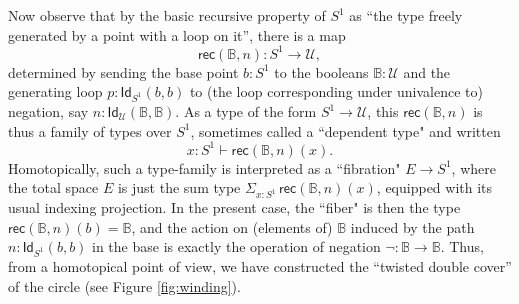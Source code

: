 \documentclass[11pt]{article}
\newcommand{\B}{\ensuremath{\mathbb{B}}}
\newcommand{\Id}{\mathsf{Id}}
\newcommand{\id}[1]{\Id_{#1}}
\newcommand{\rec}{\mathsf{rec}}
\newcommand{\U}{\ensuremath{\mathcal{U}}}
\theoremstyle{remark}
\theoremstyle{definition}
\begin{document}
Now observe that by the basic recursive property of $S^1$ as ``the type freely generated by a point with a loop on it'', there is a map $$\rec(\B,n): S^1 \to \U,$$ determined by sending the base point $b:S^1$ to the booleans $\B:\U$ and the generating loop $p : \id{S^1}(b,b)$ to (the loop corresponding under univalence to) negation, say $n : \id{\U}(\B,\B)$.  As a type of the form $S^1\to\U$, this $\rec(\B,n)$ is thus a family of types over $S^1$, sometimes called a ``dependent type" and written $$x:S^1 \vdash \rec(\B,n)(x).$$  Homotopically, such a type-family is interpreted as a ``fibration" $E\to S^1$, where the total space $E$ is just the sum type $\Sigma_{x:S^1}\,\rec(\B,n)(x)$, equipped with its usual indexing projection.  In the present case, the ``fiber" is then the type $\rec(\B,n)(b) = \B$, and the action on (elements of) $\B$ induced by the path $n: \id{S^1}(b,b)$ in the base is exactly the operation of negation $\neg : \B\to \B$.  Thus, from a homotopical point of view, we have constructed the ``twisted double cover'' of the circle (see Figure \ref{fig:winding}).
%
%
%
\end{document}
